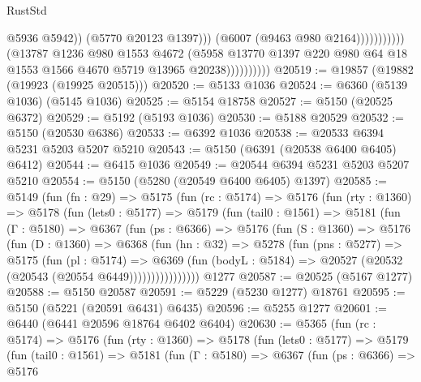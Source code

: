 \begin{lexlean}{RustStd}
\begin{coremodule}
                                              @5936
                                              @5942))
                                          (@5770 @20123 @1397)))
                                      (@6007 (@9463 @980 @2164)))))))))))
                    (@13787
                      @1236
                      @980
                      @1553
                      @4672
                      (@5958
                        @13770
                        @1397
                        @220
                        @980
                        @64
                        @18
                        @1553
                        @1566
                        @4670
                        @5719
                        @13965
                        @20238))))))))))
@20519 := @19857 (@19882 (@19923 (@19925 @20515)))
@20520 := @5133 @1036
@20524 := @6360 (@5139 @1036) (@5145 @1036)
@20525 := @5154 @18758
@20527 := @5150 (@20525 @6372)
@20529 := @5192 (@5193 @1036)
@20530 := @5188 @20529
@20532 := @5150 (@20530 @6386)
@20533 := @6392 @1036
@20538 := @20533 @6394 @5231 @5203 @5207 @5210
@20543 := @5150 (@6391 (@20538 @6400 @6405) @6412)
@20544 := @6415 @1036
@20549 := @20544 @6394 @5231 @5203 @5207 @5210
@20554 := @5150 (@5280 (@20549 @6400 @6405) @1397)
@20585 := @5149
    (fun (fn : @29) =>
    @5175
      (fun (rc : @5174) =>
      @5176
        (fun (rty : @1360) =>
        @5178
          (fun (lets0 : @5177) =>
          @5179
            (fun (tail0 : @1561) =>
            @5181
              (fun (Γ : @5180) =>
              @6367
                (fun (ps : @6366) =>
                @5176
                  (fun (S : @1360) =>
                  @5176
                    (fun (D : @1360) =>
                    @6368
                      (fun (hn : @32) =>
                      @5278
                        (fun (pns : @5277) =>
                        @5175
                          (fun (pl : @5174) =>
                          @6369
                            (fun (bodyL : @5184) =>
                            @20527 (@20532 (@20543 (@20554 @6449))))))))))))))))
    @1277
@20587 := @20525 (@5167 @1277)
@20588 := @5150 @20587
@20591 := @5229 (@5230 @1277) @18761
@20595 := @5150 (@5221 (@20591 @6431) @6435)
@20596 := @5255 @1277
@20601 := @6440 (@6441 @20596 @18764 @6402 @6404)
@20630 := @5365
    (fun (rc : @5174) =>
    @5176
      (fun (rty : @1360) =>
      @5178
        (fun (lets0 : @5177) =>
        @5179
          (fun (tail0 : @1561) =>
          @5181
            (fun (Γ : @5180) =>
            @6367
              (fun (ps : @6366) =>
              @5176

\end{coremodule}
\end{lexlean}
